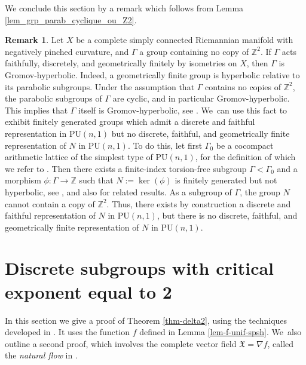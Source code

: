 \documentclass[11pt]{article}
\theoremstyle{definition}
\newtheorem*{remark}{Remark}
\newcommand{\Z}{\mathbb{Z}}
\newcommand{\PU}{\mathrm{PU}}
\newcommand{\PU}{\mathrm{PU}}
\begin{document}
We conclude this section by a remark which follows from Lemma \ref{lem_grp_parab_cyclique_ou_Z2}.
\begin{remark}
Let $X$ be a complete simply connected Riemannian manifold with negatively pinched curvature, and $\Gamma$ a group containing no copy of $\Z^{2}$. If $\Gamma$ acts faithfully, discretely, and geometrically finitely by isometries on $X$, then $\Gamma$ is Gromov-hyperbolic. Indeed, a geometrically finite group is hyperbolic relative to its parabolic subgroups. Under the assumption that $\Gamma$ contains no copies of $\Z^{2}$, the parabolic subgroups of $\Gamma$ are cyclic, and in particular Gromov-hyperbolic. This implies that $\Gamma$ itself is Gromov-hyperbolic, see \cite{osinRelativelyHyperbolicGroups2006}. We~can use this fact to exhibit finitely generated groups which admit a discrete and faithful representation in $\PU(n,1)$ but no discrete, faithful, and geometrically finite representation of $N$ in $\PU(n,1)$. To do this, let first $\Gamma_0$ be a cocompact arithmetic lattice of the simplest type of $\PU(n,1)$, for the definition of which we refer to \cite[\S VIII.5]{borelContinuousCohomologyDiscrete2000}. Then there exists a finite-index torsion-free subgroup $\Gamma<\Gamma_0$ and a morphism $\phi:\Gamma \to \Z$ such that $N:=\ker(\phi)$ is finitely generated but not hyperbolic, see \cite{llosaisenrichSubgroupsHyperbolicGroups2024}, and also \cite{italianoHyperbolic5manifoldsThat2023-manuel} for related results. As a subgroup of $\Gamma$, the group $N$ cannot contain a copy of $\Z^{2}$. Thus, there exists by construction a discrete and faithful representation of $N$ in $\PU(n,1)$, but there is no discrete, faithful, and geometrically finite representation of $N$ in $\PU(n,1)$.
\end{remark}

\section{Discrete subgroups with critical exponent equal to 2}\label{section-delta2}

In this section we give a proof of Theorem \ref{thm-delta2}, using the techniques developed in \cite{connellNaturalFlowCritical2023}. It uses the function $f$ defined in Lemma \ref{lem-f-unif-spsh}. We~also outline a second proof, which involves the complete vector field $\mathfrak{X}=\nabla{f}$, called the \textit{natural flow} in \cite{connellNaturalFlowCritical2023}.
\end{document}
